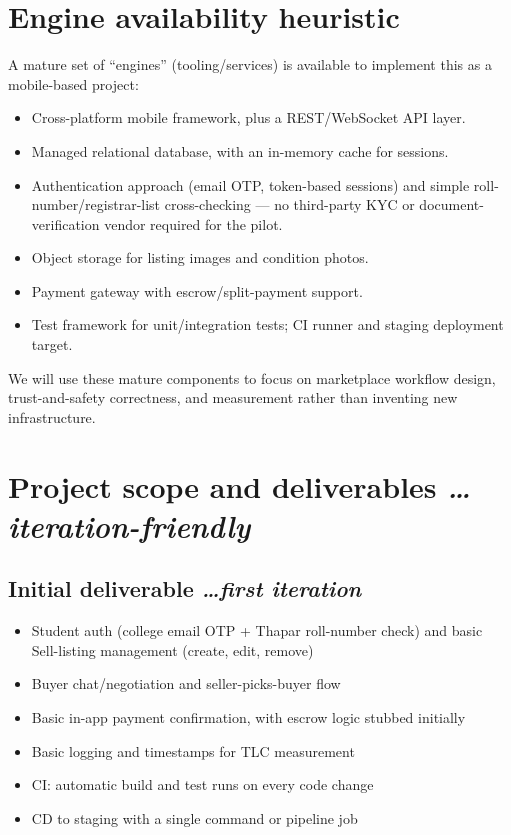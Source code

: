 \documentclass[11pt,a4paper]{article}
\newcommand{\BvrHint}[1]{%
  {\normalfont\normalsize\itshape\hfill #1}}
\begin{document}
\section{Engine availability heuristic}
A mature set of ``engines'' (tooling/services) is available to implement
this as a mobile-based project:
\begin{itemize}[leftmargin=0.7cm]
    \item Cross-platform mobile framework, plus a REST/WebSocket API layer.
    \item Managed relational database, with an in-memory cache for sessions.
    \item Authentication approach (email OTP, token-based sessions) and simple roll-number/registrar-list cross-checking — no third-party KYC or document-verification vendor required for the pilot.
    \item Object storage for listing images and condition photos.
    \item Payment gateway with escrow/split-payment support.
    \item Test framework for unit/integration tests; CI runner and staging deployment target.
\end{itemize}
We will use these mature components to focus on marketplace workflow
design, trust-and-safety correctness, and measurement rather than
inventing new infrastructure.

\section{Project scope and deliverables %
\BvrHint{\ldots iteration-friendly}}
\subsection{Initial deliverable %
\BvrHint{\ldots first iteration}}
\begin{itemize}[leftmargin=0.7cm]
    \item Student auth (college email OTP + Thapar roll-number check) and basic Sell-listing management (create, edit, remove)
    \item Buyer chat/negotiation and seller-picks-buyer flow
    \item Basic in-app payment confirmation, with escrow logic stubbed initially
    \item Basic logging and timestamps for TLC measurement
    \item CI: automatic build and test runs on every code change
    \item CD to staging with a single command or pipeline job
\end{itemize}
\end{document}
